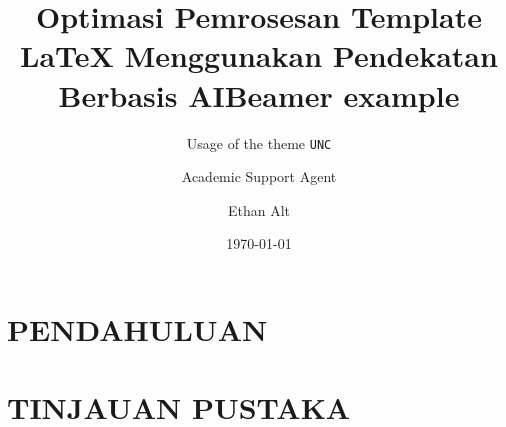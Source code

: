 \documentclass{beamer}
\title{Optimasi Pemrosesan Template LaTeX Menggunakan Pendekatan Berbasis AI}
\author{Academic Support Agent}
\date{\today}
\begin{document}
\maketitle

\begin{abstract}

\end{abstract}

\chapter{PENDAHULUAN}


\chapter{TINJAUAN PUSTAKA}




\usepackage[utf8]{inputenx}
\usepackage{csquotes}       %
\usepackage{microtype}      %
\usepackage{amssymb}        %
\usepackage{mathtools}      %
\usepackage[absolute, overlay]{textpos} %
\setlength{\TPHorizModule}{\paperwidth} %
\setlength{\TPVertModule}{\paperheight} %
\usepackage{tikz}
\usetikzlibrary{overlay-beamer-styles}  %




\author{Ethan Alt}
\title{Beamer example}
\subtitle{Usage of the theme \texttt{UNC}}
\end{document}

